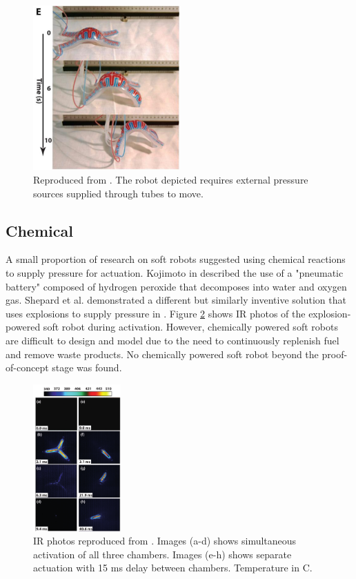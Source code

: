 \documentclass[a4paper,12pt]{article}
\begin{document}
\begin{figure}[h!]
    \centering
    \includegraphics[width=0.5\textwidth]{externalpressure.png}
    \caption{Reproduced from \cite{morinCamouflageDisplaySoft2012}. The robot depicted requires external pressure sources supplied through tubes to move.}
    \label{fg:externalpressure}
\end{figure}

\subsection{Chemical}
A small proportion of research on soft robots suggested using chemical reactions to supply pressure for actuation. Kojimoto in \cite{kojimotoPneumaticBatteryChemical2012} described the use of a "pneumatic battery" composed of hydrogen peroxide that decomposes into water and oxygen gas. Shepard et al. demonstrated a different but similarly inventive solution that uses explosions to supply pressure in \cite{shepherdUsingExplosionsPower2013}. Figure \ref{fg:explosions} shows IR photos of the explosion-powered soft robot during activation. However, chemically powered soft robots are difficult to design and model due to the need to continuously replenish fuel and remove waste products. No chemically powered soft robot beyond the proof-of-concept stage was found.

\begin{figure}[h!]
    \centering
    \includegraphics[width=0.3\textwidth]{explosions.png}
    \caption{IR photos reproduced from \cite{shepherdUsingExplosionsPower2013}. Images (a-d) shows simultaneous activation of all three chambers. Images (e-h) shows separate actuation with 15 ms delay between chambers. Temperature in \degree C.}
    \label{fg:explosions}
\end{figure}
\end{document}
